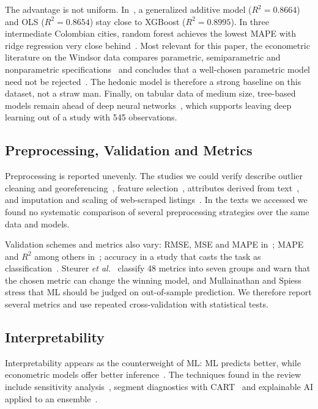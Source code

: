 \documentclass[conference]{IEEEtran}
\begin{document}
The advantage is not uniform. In~\cite{stang2022}, a generalized additive model ($R^2 = 0.8664$) and OLS ($R^2 = 0.8654$) stay close to XGBoost ($R^2 = 0.8995$). In three intermediate Colombian cities, random forest achieves the lowest MAPE with ridge regression very close behind~\cite{rossomateus2022}. Most relevant for this paper, the econometric literature on the Windsor data compares parametric, semiparametric and nonparametric specifications~\cite{anglin1996,parmeter2007,haupt2010} and concludes that a well-chosen parametric model need not be rejected~\cite{haupt2010}. The hedonic model is therefore a strong baseline on this dataset, not a straw man. Finally, on tabular data of medium size, tree-based models remain ahead of deep neural networks~\cite{grinsztajn2022}, which supports leaving deep learning out of a study with 545 observations.

\subsection{Preprocessing, Validation and Metrics}

Preprocessing is reported unevenly. The studies we could verify describe outlier cleaning and georeferencing~\cite{stang2022}, feature selection~\cite{yalpir2021}, attributes derived from text~\cite{perezrave2020}, and imputation and scaling of web-scraped listings~\cite{rossomateus2022}. In the texts we accessed we found no systematic comparison of several preprocessing strategies over the same data and models.

Validation schemes and metrics also vary: RMSE, MSE and MAPE in~\cite{ho2021}; MAPE and $R^2$ among others in~\cite{stang2022}; accuracy in a study that casts the task as classification~\cite{park2015}. Steurer \emph{et al.}~\cite{steurer2021} classify 48 metrics into seven groups and warn that the chosen metric can change the winning model, and Mullainathan and Spiess~\cite{mullainathan2017} stress that ML should be judged on out-of-sample prediction. We therefore report several metrics and use repeated cross-validation with statistical tests.

\subsection{Interpretability}

Interpretability appears as the counterweight of ML: ML predicts better, while econometric models offer better inference~\cite{valier2020}. The techniques found in the review include sensitivity analysis~\cite{dimopoulos2019}, segment diagnostics with CART~\cite{antipov2012} and explainable AI applied to an ensemble~\cite{deng2025}.
\end{document}
